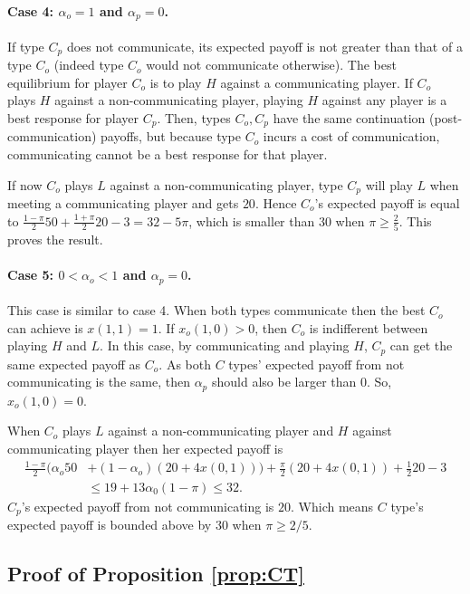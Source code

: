\documentclass[12pt]{article}
\theoremstyle{break}
\begin{document}
	\paragraph{Case 4: $\alpha_o = 1$ and $\alpha_p = 0$.} If type $C_p$ does not communicate, its expected payoff is not greater than that of a type $C_o$ (indeed type $C_o$ would not communicate otherwise). The best equilibrium for player $C_o$ is to play $H$ against a communicating player. If $C_o$ plays $H$ against a non-communicating player, playing $H$ against any player is a best response for player $C_p$. Then, types $C_o,C_p$ have the same continuation (post-communication) payoffs, but because type $C_o$ incurs a cost of communication, communicating cannot be a best response for that player. 
	
	If now $C_o$ plays $L$ against a non-communicating player, type $C_p$ will play $L$ when meeting a communicating player and gets $20$.  Hence $C_o$'s expected payoff is equal to $\frac{1-\pi}{2}50+\frac{1+\pi}{2}20-3=32-5\pi$, which is smaller than $30$ when $\pi\geq \frac{2}{5}$. This proves the result.

    \paragraph{Case 5: $0 < \alpha_o < 1$ and $\alpha_p = 0$.} This case is similar to case 4. When both types communicate then the best $C_o$ can achieve is $x(1,1)=1$. If $x_o(1,0)>0$, then $C_o$ is indifferent between playing $H$ and $L$. In this case, by communicating and playing $H$, $C_p$ can get the same expected payoff as $C_o$. As both $C$ types' expected payoff from not communicating is the same, then $\alpha_p$ should also be larger than $0$. So, $x_o(1,0)=0$.
    
    When $C_o$ plays $L$ against a non-communicating player and $H$ against communicating player then her expected payoff is
    \begin{align*}
    \frac{1-\pi}{2} (\alpha_o 50 & + (1-\alpha_o)(20+4x(0,1))) + \frac{\pi}{2}(20+4x(0,1))+\frac{1}{2}20-3 \\ 
    & \leq 19+13\alpha_0 (1-\pi) \leq 32.
    \end{align*}
    $C_p$'s expected payoff from not communicating is $20$. Which means $C$ type's expected payoff is bounded above by $30$ when $\pi\geq 2/5$.
    
\subsection*{Proof of Proposition \ref{prop:CT}}
\end{document}
